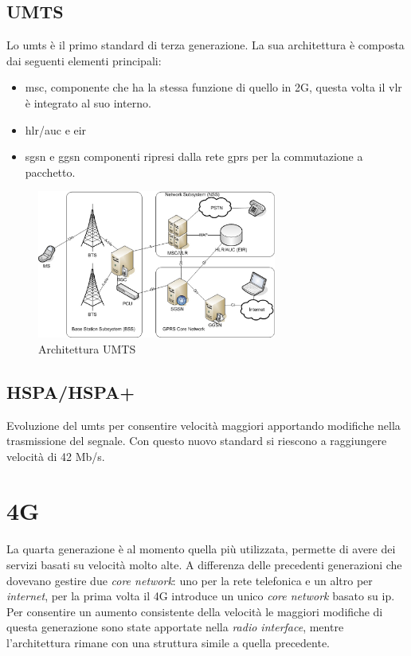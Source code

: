 \subsection{UMTS}
Lo \gls{umts} è il primo standard di terza generazione.
La sua architettura è composta dai seguenti elementi principali:
\begin{itemize}
    \item \gls{msc}, componente che ha la stessa funzione di quello in 2G, questa volta il \gls{vlr} è integrato al suo interno.
    \item \gls{hlr}/\gls{auc} e \gls{eir}
    \item \gls{sgsn} e \gls{ggsn} componenti ripresi dalla rete \gls{gprs} per la commutazione a pacchetto.
\end{itemize}
\begin{figure}[ht]
    \centering
    \includegraphics[width=0.7\textwidth]{images/3g-umts.png}
    \caption{Architettura UMTS}
\end{figure}


\subsection{HSPA/HSPA+}
Evoluzione del \gls{umts} per consentire velocità maggiori apportando modifiche nella trasmissione del segnale.
Con questo nuovo standard si riescono a raggiungere velocità di 42 Mb/s\cite{hspa}.

\clearpage

\section{4G}
La quarta generazione è al momento quella più utilizzata, permette di avere dei servizi basati su velocità molto alte. 
A differenza delle precedenti generazioni che dovevano gestire due \textit{core network}: uno per la rete telefonica e un altro
per \textit{internet}, per la prima volta il 4G introduce un unico \textit{core network} basato su \gls{ip}.\\
Per consentire un aumento consistente della velocità le maggiori modifiche di questa generazione sono state apportate nella \textit{radio interface}, mentre
l'architettura rimane con una struttura simile a quella precedente.
